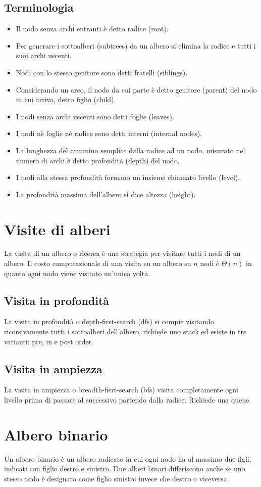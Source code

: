 \subsection{Terminologia}
\begin{itemize}
\item Il nodo senza archi entranti \`e detto radice (root).
\item Per generare i sottoalberi (subtrees) da un albero si elimina la radice e tutti i suoi archi uscenti.
\item Nodi con lo stesso genitore sono detti fratelli (siblings).
\item Considerando un arco, il nodo da cui parte \`e detto genitore (parent) del nodo in cui arriva, detto figlio (child).
\item I nodi senza archi uscenti sono detti foglie (leaves).
\item I nodi n\`e foglie n\`e radice sono detti interni (internal nodes).
\item La lunghezza del cammino semplice dalla radice ad un nodo, misurato nel numero di archi \`e detto profondit\`a (depth) del nodo.
\item I nodi alla stessa profondit\`a formano un insieme chiamato livello (level).
\item La profondit\`a massima dell'albero si dice altezza (height).
\end{itemize}
\section{Visite di alberi}
La visita di un albero o ricerca \`e una strategia per visitare tutti i nodi di un albero. Il costo computazionale di una visita su un albero su $n$ nodi
\`e $\Theta(n)$ in quanto ogni nodo viene visitato un'unica volta.
\subsection{Visita in profondit\`a}
La visita in profondit\`a o depth-first-search (dfs) si compie visitando ricorsivamente tutti i sottoalberi dell'albero, richiede uno stack ed esiste in tre 
varianti: pre, in e post order.
\subsection{Visita in ampiezza}
La visita in ampiezza o breadth-fisrt-search (bfs) visita completamente ogni livello prima di passare al successivo partendo dalla radice. Richiede una 
queue.
\section{Albero binario}
Un albero binario \`e un albero radicato in cui ogni nodo ha al massimo due figli, indicati con figlio destro e sinistro. Due alberi binari differiscono 
anche se uno stesso nodo \`e designato come figlio sinistro invece che destro o viceversa.
